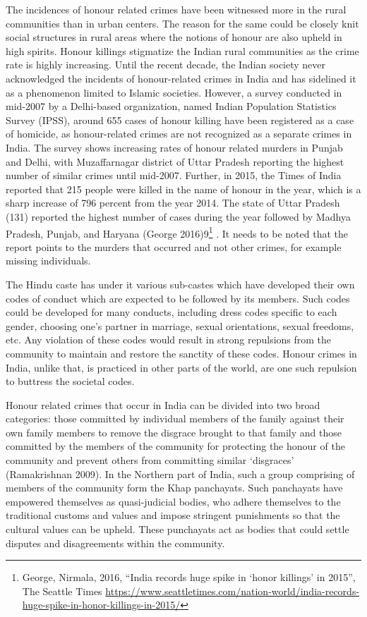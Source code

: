 \begin{multicols}{2}
\noi
The incidences of honour related crimes have been witnessed more in the rural
communities than in urban centers. The reason for the same could be closely knit social
structures in rural areas where the notions of honour are also upheld in high spirits.
Honour killings stigmatize the Indian rural communities as the crime rate is highly
increasing. Until the recent decade, the Indian society never acknowledged the incidents
of honour-related crimes in India and has sidelined it as a phenomenon limited to
Islamic societies. However, a survey conducted in mid-2007 by a Delhi-based
organization, named Indian Population Statistics Survey (IPSS), around 655 cases of
honour killing have been registered as a case of homicide, as honour-related crimes are
not recognized as a separate crimes in India. The survey shows increasing rates of
honour related murders in Punjab and Delhi, with Muzaffarnagar district of Uttar
Pradesh reporting the highest number of similar crimes until mid-2007. Further, in
2015, the Times of India reported that 215 people were killed in the name of honour in
the year, which is a sharp increase of 796 percent from the year 2014. The state of Uttar
Pradesh (131) reported the highest number of cases during the year followed by Madhya
Pradesh, Punjab, and Haryana (George 2016)9\footnote{George, Nirmala, 2016, “India records huge spike in ‘honor killings’ in 2015”, The Seattle Times
\url{https://www.seattletimes.com/nation-world/india-records-huge-spike-in-honor-killings-in-2015/}}
. It needs to be noted that the report points
to the murders that occurred and not other crimes, for example missing individuals.


\noi
The Hindu caste has under it various sub-castes which have developed their own codes
of conduct which are expected to be followed by its members. Such codes could be
developed for many conducts, including dress codes specific to each gender, choosing
one's partner in marriage, sexual orientations, sexual freedoms, etc. Any violation of
these codes would result in strong repulsions from the community to maintain and
restore the sanctity of these codes. Honour crimes in India, unlike that, is practiced in
other parts of the world, are one such repulsion to buttress the societal codes. 

\noi
Honour related crimes that occur in India can be divided into two broad categories:
those committed by individual members of the family against their own family members to remove the disgrace brought to that family and those committed by the
members of the community for protecting the honour of the community and prevent
others from committing similar ‘disgraces’ (Ramakrishnan 2009). In the Northern part
of India, such a group comprising of members of the community form the Khap
panchayats. Such panchayats have empowered themselves as quasi-judicial bodies,
who adhere themselves to the traditional customs and values and impose stringent
punishments so that the cultural values can be upheld. These punchayats act as bodies
that could settle disputes and disagreements within the community.


\end{multicols}
